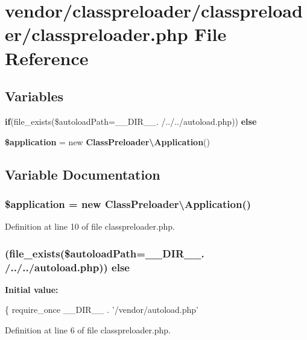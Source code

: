 \section{vendor/classpreloader/classpreloader/classpreloader.php File Reference}
\label{classpreloader_2classpreloader_2classpreloader_8php}
\subsection*{Variables}
\begin{DoxyCompactItemize}
\item 
{\bf if}(file\+\_\+exists(\$autoload\+Path=\+\_\+\+\_\+\+D\+I\+R\+\_\+\+\_\+. \textquotesingle{}/../../autoload.\+php\textquotesingle{})) {\bf else}
\item 
{\bf \$application} = new {\bf Class\+Preloader\textbackslash{}\+Application}()
\end{DoxyCompactItemize}


\subsection{Variable Documentation}
\subsubsection[{\$application}]{\setlength{\rightskip}{0pt plus 5cm}\$application = new {\bf Class\+Preloader\textbackslash{}\+Application}()}\label{classpreloader_2classpreloader_2classpreloader_8php_a537fa9b460dddc2a67074faab810398a}


Definition at line 10 of file classpreloader.\+php.

\subsubsection[{else}]{ (file\+\_\+exists(\$autoload\+Path=\+\_\+\+\_\+\+D\+I\+R\+\_\+\+\_\+. \textquotesingle{}/../../autoload.\+php\textquotesingle{})) else}\label{classpreloader_2classpreloader_2classpreloader_8php_ac26eda928b6a866afa0910425a04a6aa}
{\bfseries Initial value\+:}
\begin{DoxyCode}
\{
    require\_once \_\_DIR\_\_ . \textcolor{stringliteral}{'/vendor/autoload.php'}
\end{DoxyCode}


Definition at line 6 of file classpreloader.\+php.


